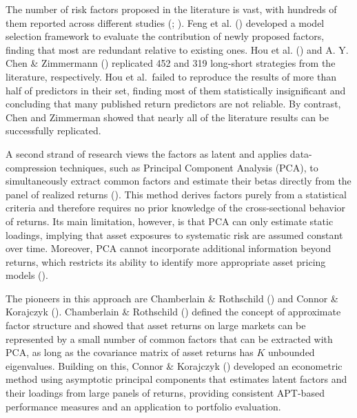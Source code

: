 \documentclass[
  12pt,
  a4paper,
  openany]{scrbook}
\begin{document}
The number of risk factors proposed in the literature is vast, with
hundreds of them reported across different studies
(;
). Feng et al.
() developed a model selection
framework to evaluate the contribution of newly proposed factors,
finding that most are redundant relative to existing ones. Hou et al.
() and A. Y. Chen \&
Zimmermann () replicated 452 and
319 long-short strategies from the literature, respectively. Hou et
al.~failed to reproduce the results of more than half of predictors in
their set, finding most of them statistically insignificant and
concluding that many published return predictors are not reliable. By
contrast, Chen and Zimmerman showed that nearly all of the literature
results can be successfully replicated.

A second strand of research views the factors as latent and applies
data-compression techniques, such as Principal Component Analysis (PCA),
to simultaneously extract common factors and estimate their betas
directly from the panel of realized returns
(). This method derives factors purely from a statistical criteria
and therefore requires no prior knowledge of the cross-sectional
behavior of returns. Its main limitation, however, is that PCA can only
estimate static loadings, implying that asset exposures to systematic
risk are assumed constant over time. Moreover, PCA cannot incorporate
additional information beyond returns, which restricts its ability to
identify more appropriate asset pricing models
().

The pioneers in this approach are Chamberlain \& Rothschild
() and Connor \&
Korajczyk ().
Chamberlain \& Rothschild
() defined the
concept of approximate factor structure and showed that asset returns on
large markets can be represented by a small number of common factors
that can be extracted with PCA, as long as the covariance matrix of
asset returns has \(K\) unbounded eigenvalues. Building on this, Connor
\& Korajczyk ()
developed an econometric method using asymptotic principal components
that estimates latent factors and their loadings from large panels of
returns, providing consistent APT-based performance measures and an
application to portfolio evaluation.
\end{document}
